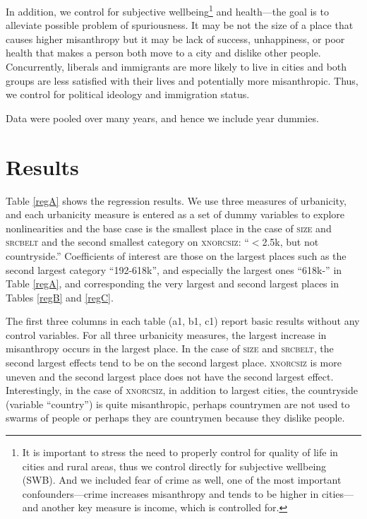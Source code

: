 \documentclass[11pt, letterpaper]{article}
\begin{document}
\begin{spacing}{1.4}
In addition, we control for subjective wellbeing\footnote{It is important to stress the need to properly control for quality of life in cities and rural areas, thus we control directly for subjective wellbeing (SWB). And we included fear of crime as well, one of the most important confounders---crime increases misanthropy and tends to be higher in cities---and another key measure is income, which is controlled for.} and health---the goal is to alleviate possible problem of spuriousness. It may be not the size of a place that causes higher misanthropy but it may be lack of success, unhappiness, or poor health that makes a person both move to a city and dislike other people. Concurrently, liberals and immigrants are more likely to live in cities and both groups are less satisfied with their lives \citep{aok11a,aokJap14} and potentially more misanthropic. Thus, we control for political ideology and immigration status.

Data were pooled over many years, and hence we include year dummies. 

\section*{Results}

Table \ref{regA} shows the regression results. We use three measures of
urbanicity, and each urbanicity measure is entered as a set of dummy variables to
explore nonlinearities and the base case is the smallest place in the case of
\textsc{size} and \textsc{srcbelt} and the second smallest category on \textsc{xnorcsiz}:
 ``$<$2.5k, but not countryside.'' Coefficients of interest are those on the
 largest  places such as the second largest category ``192-618k'', and especially the largest ones ``618k-'' in Table
\ref{regA}, and corresponding the very largest and second largest places in Tables
\ref{regB} and \ref{regC}.

The first three columns in each table (a1, b1, c1) report basic results without any control variables. For all three
urbanicity measures, the largest increase in misanthropy occurs in the largest
place. In the case of \textsc{size} and \textsc{srcbelt}, the second largest effects
tend to be on the second largest place. \textsc{xnorcsiz} is more uneven and the
second largest place does not have the second largest effect. Interestingly, in
the case of \textsc{xnorcsiz}, in addition to largest cities,  the countryside (variable ``country'') is quite
misanthropic, perhaps countrymen are not used to swarms of people or perhaps they are countrymen because they dislike people. 


\end{spacing}
\end{document}
